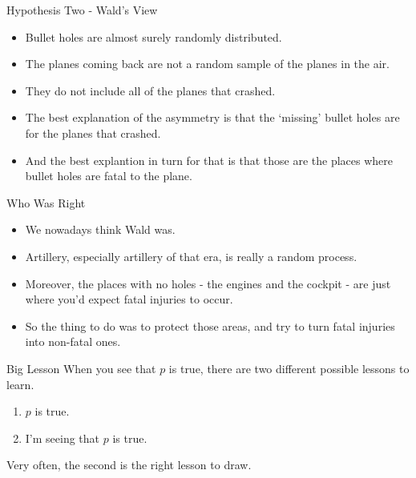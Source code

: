 \documentclass[
  ignorenonframetext,
]{beamer}
\providecommand{\tightlist}{%
  \setlength{\itemsep}{0pt}\setlength{\parskip}{0pt}}
\renewcommand{\,}{\text{, }}
\begin{document}
\begin{frame}{Hypothesis Two - Wald's View}
\protect\hypertarget{hypothesis-two---walds-view}{}
\begin{itemize}
\tightlist
\item
  Bullet holes are almost surely randomly distributed.
\item
  The planes coming back are not a random sample of the planes in the
  air.
\item
  They do not include all of the planes that crashed.
\item
  The best explanation of the asymmetry is that the `missing' bullet
  holes are for the planes that crashed.
\item
  And the best explantion in turn for that is that those are the places
  where bullet holes are fatal to the plane.
\end{itemize}
\end{frame}

\begin{frame}{Who Was Right}
\protect\hypertarget{who-was-right}{}
\begin{itemize}
\tightlist
\item
  We nowadays think Wald was.
\item
  Artillery, especially artillery of that era, is really a random
  process.
\item
  Moreover, the places with no holes - the engines and the cockpit - are
  just where you'd expect fatal injuries to occur.
\item
  So the thing to do was to protect those areas, and try to turn fatal
  injuries into non-fatal ones.
\end{itemize}
\end{frame}

\begin{frame}{Big Lesson}
\protect\hypertarget{big-lesson}{}
When you see that \(p\) is true, there are two different possible
lessons to learn.

\begin{enumerate}
\tightlist
\item
  \(p\) is true.
\item
  I'm seeing that \(p\) is true.
\end{enumerate}

Very often, the second is the right lesson to draw.
\end{frame}
\end{document}
